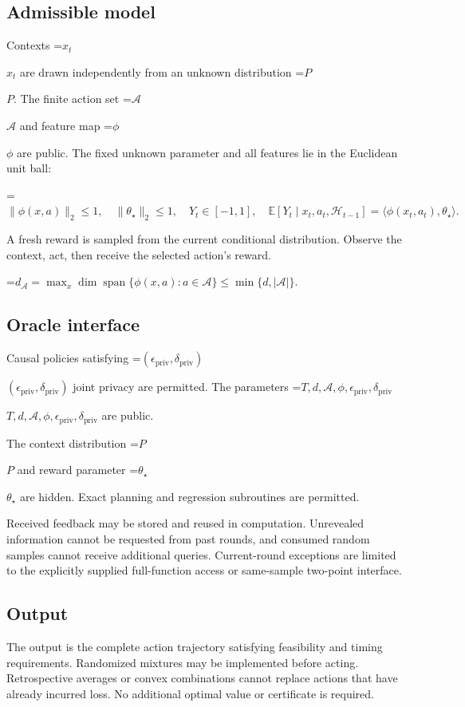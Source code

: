 \documentclass[10pt,a4paper]{article}
\newcommand{\AtlasMath}[1]{\par\begingroup\centering\setbox0=\hbox{$\displaystyle #1$}\ifdim\wd0>1.4\linewidth\typeout{ATLAS WIDE FORMULA: \the\wd0}\fi\ifdim\wd0>\linewidth\resizebox{\linewidth}{!}{\box0}\else\box0\fi\par\endgroup}
\newcommand{\AtlasInlineMath}[1]{\begingroup\setbox0=\hbox{$#1$}\ifdim\wd0>.4\linewidth\endgroup\AtlasMath{#1}\else\endgroup$#1$\fi}
\begin{document}
\subsection{Admissible model}
Contexts \AtlasInlineMath{x_t} are drawn independently from an unknown distribution \AtlasInlineMath{P}. The finite action set \AtlasInlineMath{\mathcal{A}} and feature map \AtlasInlineMath{\phi} are public. The fixed unknown parameter and all features lie in the Euclidean unit ball:


\AtlasMath{\|\phi(x,a)\|_2\le1,\quad\|\theta_\star\|_2\le1,\quad Y_t\in[-1,1],\quad\mathbb{E}[Y_t\mid x_t,a_t,\mathcal{H}_{t-1}]=\langle\phi(x_t,a_t),\theta_\star\rangle.}


A fresh reward is sampled from the current conditional distribution. Observe the context, act, then receive the selected action's reward.


\AtlasMath{d_{\mathcal{A}}=\max_x\dim\operatorname{span}\{\phi(x,a):a\in\mathcal{A}\}\le\min\{d,|\mathcal{A}|\}.}


\subsection{Oracle interface}
Causal policies satisfying \AtlasInlineMath{(\epsilon_{\mathrm{priv}},\delta_{\mathrm{priv}})} joint privacy are permitted. The parameters \AtlasInlineMath{T,d,\mathcal{A},\phi,\epsilon_{\mathrm{priv}},\delta_{\mathrm{priv}}} are public.

The context distribution \AtlasInlineMath{P} and reward parameter \AtlasInlineMath{\theta_\star} are hidden. Exact planning and regression subroutines are permitted.

Received feedback may be stored and reused in computation. Unrevealed information cannot be requested from past rounds, and consumed random samples cannot receive additional queries. Current-round exceptions are limited to the explicitly supplied full-function access or same-sample two-point interface.

\subsection{Output}
The output is the complete action trajectory satisfying feasibility and timing requirements. Randomized mixtures may be implemented before acting. Retrospective averages or convex combinations cannot replace actions that have already incurred loss. No additional optimal value or certificate is required.
\end{document}
